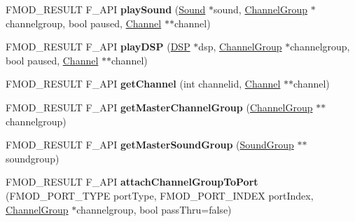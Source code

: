 \begin{DoxyCompactItemize}
\item 
\hypertarget{class_f_m_o_d_1_1_system_aa0eff9e71f48fd3710b5eba1a3b6d2b4}{F\+M\+O\+D\+\_\+\+R\+E\+S\+U\+L\+T F\+\_\+\+A\+P\+I {\bfseries play\+Sound} (\hyperlink{class_f_m_o_d_1_1_sound}{Sound} $\ast$sound, \hyperlink{class_f_m_o_d_1_1_channel_group}{Channel\+Group} $\ast$channelgroup, bool paused, \hyperlink{class_f_m_o_d_1_1_channel}{Channel} $\ast$$\ast$channel)}\label{class_f_m_o_d_1_1_system_aa0eff9e71f48fd3710b5eba1a3b6d2b4}

\item 
\hypertarget{class_f_m_o_d_1_1_system_a5a7f588f24305ff9cd888a191b9554a3}{F\+M\+O\+D\+\_\+\+R\+E\+S\+U\+L\+T F\+\_\+\+A\+P\+I {\bfseries play\+D\+S\+P} (\hyperlink{class_f_m_o_d_1_1_d_s_p}{D\+S\+P} $\ast$dsp, \hyperlink{class_f_m_o_d_1_1_channel_group}{Channel\+Group} $\ast$channelgroup, bool paused, \hyperlink{class_f_m_o_d_1_1_channel}{Channel} $\ast$$\ast$channel)}\label{class_f_m_o_d_1_1_system_a5a7f588f24305ff9cd888a191b9554a3}

\item 
\hypertarget{class_f_m_o_d_1_1_system_ada0bf180aafd95d6311fc6b743251299}{F\+M\+O\+D\+\_\+\+R\+E\+S\+U\+L\+T F\+\_\+\+A\+P\+I {\bfseries get\+Channel} (int channelid, \hyperlink{class_f_m_o_d_1_1_channel}{Channel} $\ast$$\ast$channel)}\label{class_f_m_o_d_1_1_system_ada0bf180aafd95d6311fc6b743251299}

\item 
\hypertarget{class_f_m_o_d_1_1_system_ac175dc5bc0e78ce2b52eddff65d16411}{F\+M\+O\+D\+\_\+\+R\+E\+S\+U\+L\+T F\+\_\+\+A\+P\+I {\bfseries get\+Master\+Channel\+Group} (\hyperlink{class_f_m_o_d_1_1_channel_group}{Channel\+Group} $\ast$$\ast$channelgroup)}\label{class_f_m_o_d_1_1_system_ac175dc5bc0e78ce2b52eddff65d16411}

\item 
\hypertarget{class_f_m_o_d_1_1_system_abb21546d80d099e01c58b3c7235b345d}{F\+M\+O\+D\+\_\+\+R\+E\+S\+U\+L\+T F\+\_\+\+A\+P\+I {\bfseries get\+Master\+Sound\+Group} (\hyperlink{class_f_m_o_d_1_1_sound_group}{Sound\+Group} $\ast$$\ast$soundgroup)}\label{class_f_m_o_d_1_1_system_abb21546d80d099e01c58b3c7235b345d}

\item 
\hypertarget{class_f_m_o_d_1_1_system_a8f5aa192ebfeef5b0a1fe2f01a16433c}{F\+M\+O\+D\+\_\+\+R\+E\+S\+U\+L\+T F\+\_\+\+A\+P\+I {\bfseries attach\+Channel\+Group\+To\+Port} (F\+M\+O\+D\+\_\+\+P\+O\+R\+T\+\_\+\+T\+Y\+P\+E port\+Type, F\+M\+O\+D\+\_\+\+P\+O\+R\+T\+\_\+\+I\+N\+D\+E\+X port\+Index, \hyperlink{class_f_m_o_d_1_1_channel_group}{Channel\+Group} $\ast$channelgroup, bool pass\+Thru=false)}\label{class_f_m_o_d_1_1_system_a8f5aa192ebfeef5b0a1fe2f01a16433c}


\end{DoxyCompactItemize}
